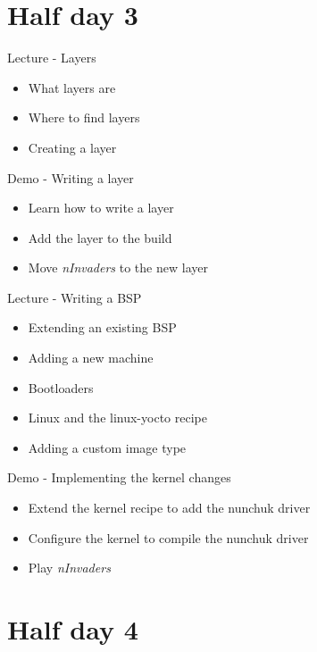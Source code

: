 \documentclass[a4paper,12pt,obeyspaces,spaces,hyphens]{article}
\begin{document}
\section{Half day 3}

\feagendatwocolumn
{Lecture - Layers}
{
  \begin{itemize}
  \item What layers are
  \item Where to find layers
  \item Creating a layer
  \end{itemize}
}
{Demo - Writing a layer}
{
  \begin{itemize}
  \item Learn how to write a layer
  \item Add the layer to the build
  \item Move {\em nInvaders} to the new layer
  \end{itemize}
}

\feagendatwocolumn
{Lecture - Writing a BSP}
{
  \begin{itemize}
  \item Extending an existing BSP
  \item Adding a new machine
  \item Bootloaders
  \item Linux and the linux-yocto recipe
  \item Adding a custom image type
  \end{itemize}
}
{Demo - Implementing the kernel changes}
{
  \begin{itemize}
  \item Extend the kernel recipe to add the nunchuk driver
  \item Configure the kernel to compile the nunchuk driver
  \item Play {\em nInvaders}
  \end{itemize}
}

\section{Half day 4}
\end{document}
